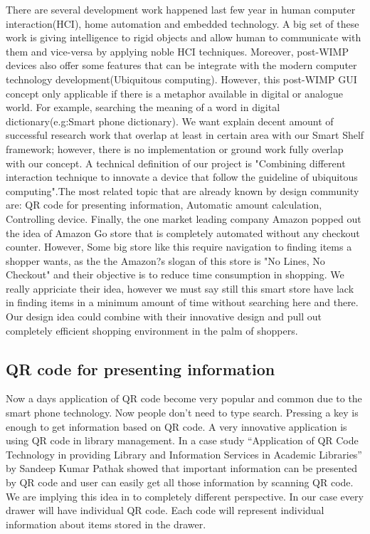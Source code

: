 There are several development work happened last few year in human computer interaction(HCI), home automation and embedded technology. A big set of these work is giving intelligence to rigid objects and allow human to communicate with them and vice-versa by applying noble HCI techniques. Moreover, post-WIMP devices also offer some features that can be integrate with the modern computer technology development(Ubiquitous computing). However, this post-WIMP GUI concept only applicable if there is a metaphor available in digital or analogue world. For example, searching the meaning of a word in digital dictionary(e.g:Smart phone dictionary). We want explain decent amount of successful research work that overlap at least in certain area with our Smart Shelf framework; however, there is no implementation or ground work fully overlap with our concept. A technical definition of our project is "Combining different interaction technique to innovate a device that follow the guideline of ubiquitous computing".The most related topic that are already known by design community are: QR code for presenting information, Automatic amount calculation, Controlling device. Finally, the one market leading company Amazon popped out the idea of   Amazon Go store that is completely automated without any checkout counter. However, Some big store like this require navigation to finding items a shopper wants, as the the Amazon?s slogan of this store is "No Lines, No Checkout" and their objective is to reduce time consumption in shopping. We really appriciate their idea, however we must say still this smart store have lack in finding items in a minimum amount of time without searching here and there. Our design idea could combine with their innovative design and pull out completely efficient shopping environment in the palm of shoppers.  
\subsection{QR code for presenting information} 
Now a days application of QR code become very popular and common due to the smart phone technology. Now people don't need to type search. Pressing a key is enough to get information based on QR code. A very innovative application is using QR code in library management. In a case study ``Application of QR Code Technology in providing Library and Information Services in Academic Libraries'' \cite{RefWorks:iitgn} by  Sandeep
Kumar Pathak showed that important information can be presented by QR code and user can easily get all those information by scanning QR code. 
We are implying this idea in to completely different perspective. In our case every drawer will have individual QR code. Each code will represent individual information about items stored in the drawer. 
